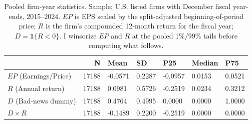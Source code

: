 \begin{table}
\caption{Pooled firm-year statistics. Sample: U.S. listed firms with December fiscal year-ends, 2015--2024. $EP$ is EPS scaled by the split-adjusted beginning-of-period price; $R$ is the firm's compounded 12-month return for the fiscal year; $D=\mathbf{1}\{R<0\}$. I winsorize $EP$ and $R$ at the pooled 1\%/99\% tails before computing what follows.}
\label{tab:desc}
\begin{tabular}{lrlllll}
\toprule
 & N & Mean & SD & P25 & Median & P75 \\
\midrule
$EP$ (Earnings/Price) & 17188 & -0.0571 & 0.2287 & -0.0957 & 0.0153 & 0.0521 \\
$R$ (Annual return) & 17188 & 0.0981 & 0.5726 & -0.2519 & 0.0234 & 0.3212 \\
$D$ (Bad-news dummy) & 17188 & 0.4764 & 0.4995 & 0.0000 & 0.0000 & 1.0000 \\
$D \times R$ & 17188 & -0.1489 & 0.2200 & -0.2519 & 0.0000 & 0.0000 \\
\bottomrule
\end{tabular}
\end{table}
